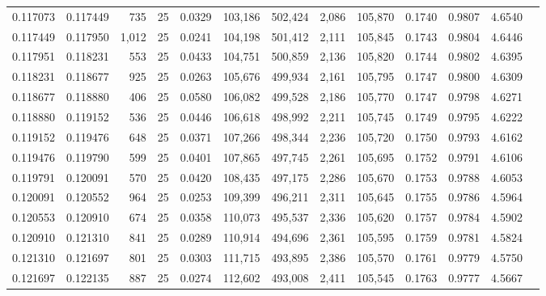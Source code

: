 \begin{tabular}{rrrrrrrrrrrrr}
0.117073 & 0.117449 &   735 &  25 &                                     0.0329 & 103,186 & 502,424 &   2,086 & 105,870 & 0.1740 & 0.9807 & 4.6540 \\
0.117449 & 0.117950 & 1,012 &  25 &                                     0.0241 & 104,198 & 501,412 &   2,111 & 105,845 & 0.1743 & 0.9804 & 4.6446 \\
0.117951 & 0.118231 &   553 &  25 &                                     0.0433 & 104,751 & 500,859 &   2,136 & 105,820 & 0.1744 & 0.9802 & 4.6395 \\
0.118231 & 0.118677 &   925 &  25 &                                     0.0263 & 105,676 & 499,934 &   2,161 & 105,795 & 0.1747 & 0.9800 & 4.6309 \\
0.118677 & 0.118880 &   406 &  25 &                                     0.0580 & 106,082 & 499,528 &   2,186 & 105,770 & 0.1747 & 0.9798 & 4.6271 \\
0.118880 & 0.119152 &   536 &  25 &                                     0.0446 & 106,618 & 498,992 &   2,211 & 105,745 & 0.1749 & 0.9795 & 4.6222 \\
0.119152 & 0.119476 &   648 &  25 &                                     0.0371 & 107,266 & 498,344 &   2,236 & 105,720 & 0.1750 & 0.9793 & 4.6162 \\
0.119476 & 0.119790 &   599 &  25 &                                     0.0401 & 107,865 & 497,745 &   2,261 & 105,695 & 0.1752 & 0.9791 & 4.6106 \\
0.119791 & 0.120091 &   570 &  25 &                                     0.0420 & 108,435 & 497,175 &   2,286 & 105,670 & 0.1753 & 0.9788 & 4.6053 \\
0.120091 & 0.120552 &   964 &  25 &                                     0.0253 & 109,399 & 496,211 &   2,311 & 105,645 & 0.1755 & 0.9786 & 4.5964 \\
0.120553 & 0.120910 &   674 &  25 &                                     0.0358 & 110,073 & 495,537 &   2,336 & 105,620 & 0.1757 & 0.9784 & 4.5902 \\
0.120910 & 0.121310 &   841 &  25 &                                     0.0289 & 110,914 & 494,696 &   2,361 & 105,595 & 0.1759 & 0.9781 & 4.5824 \\
0.121310 & 0.121697 &   801 &  25 &                                     0.0303 & 111,715 & 493,895 &   2,386 & 105,570 & 0.1761 & 0.9779 & 4.5750 \\
0.121697 & 0.122135 &   887 &  25 &                                     0.0274 & 112,602 & 493,008 &   2,411 & 105,545 & 0.1763 & 0.9777 & 4.5667 \\

\end{tabular}
